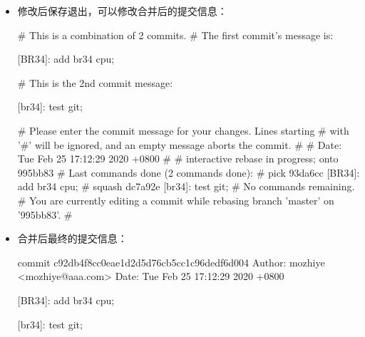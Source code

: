 \begin{itemize}
\item 修改后保存退出，可以修改合并后的提交信息：
\begin{messagebox}
# This is a combination of 2 commits.
# The first commit's message is:

[BR34]: add br34 cpu;

# This is the 2nd commit message:

[br34]: test git;

# Please enter the commit message for your changes. Lines starting
# with '#' will be ignored, and an empty message aborts the commit.
#
# Date:      Tue Feb 25 17:12:29 2020 +0800
#
# interactive rebase in progress; onto 995bb83
# Last commands done (2 commands done):
#    pick 93da6cc [BR34]: add br34 cpu;
#    squash dc7a92e [br34]: test git;
# No commands remaining.
# You are currently editing a commit while rebasing branch 'master' on '995bb83'.
#
\end{messagebox}

\item 合并后最终的提交信息：
\begin{messagebox}
commit c92db4f8cc0eae1d2d5d76cb5cc1c96dedf6d004
Author: mozhiye <mozhiye@aaa.com>
Date:   Tue Feb 25 17:12:29 2020 +0800

    [BR34]: add br34 cpu;
        
    [br34]: test git;
\end{messagebox}

\end{itemize}


